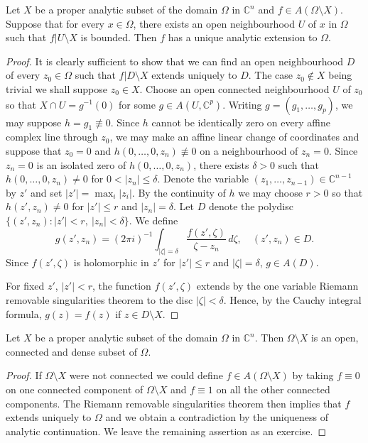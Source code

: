  Let $X$ be a proper analytic subset of the domain $\Omega$ in $\mathbb C^n$ and $f\in A(\Omega\setminus X)$. Suppose that for every $x\in\Omega$, there exists an open neighbourhood $U$ of $x$ in $\Omega$ such that $f|U\setminus X$ is bounded. Then $f$ has a unique analytic extension to $\Omega$.
\begin{proof}
It is clearly sufficient to show that we can find an open neighbourhood $D$ of every $z_0\in\Omega$ such that $f|D\setminus X$ extends uniquely to $D$. The case $z_0\notin X$ being trivial we shall suppose $z_0\in X$. Choose an open connected neighbourhood $U$ of $z_0$ so that $X\cap U=g^{-1}(0)$ for some $g\in A(U,\mathbb C^p)$. Writing $g=(g_1,\ldots,g_p)$, we may suppose $h=g_1\not\equiv0$. Since $h$ cannot be identically zero on every affine complex line through $z_0$, we may make an affine linear change of coordinates and suppose that $z_0=0$ and $h(0,\ldots,0,z_n)\not\equiv0$ on a neighbourhood of $z_n=0$. Since $z_n=0$ is an isolated zero of $h(0,\ldots,0,z_n)$, there exists $\delta>0$ such that $h(0,\ldots,0,z_n)\neq0$ for $0<|z_n|\leq\delta$. Denote the variable $(z_1,\ldots,z_{n-1})\in\mathbb C^{n-1}$ by $z'$ and set $|z'|=\max_i|z_i|$. By the continuity of $h$ we may choose $r>0$
so that $h(z',z_n)\neq0$ for $|z'|\leq r$ and $|z_n|=\delta$. Let $D$ denote the polydisc $\{(z',z_n):|z'|<r,\ |z_n|<\delta\}$. We define
\[g(z',z_n)=(2\pi i)^{-1}\int_{|\zeta|=\delta}\frac{f(z',\zeta)}{\zeta-z_n}\,d\zeta,\quad (z',z_n)\in D.\]
Since $f(z',\zeta)$ is holomorphic in $z'$ for $|z'|\leq r$ and $|\zeta|=\delta$, $g\in A(D)$.

For fixed $z'$, $|z'|<r$, the function $f(z',\zeta)$ extends by the one variable Riemann removable singularities theorem to the disc $|\zeta|<\delta$. Hence, by the Cauchy integral formula, $g(z)=f(z)$ if $z\in D\setminus X$.
\end{proof}
 Let $X$ be a proper analytic subset of the domain $\Omega$ in $\mathbb C^n$. Then $\Omega\setminus X$ is an open, connected and dense subset of $\Omega$.
\begin{proof}
If $\Omega\setminus X$ were not connected we could define $f\in A(\Omega\setminus X)$ by taking $f\equiv0$ on one connected component of $\Omega\setminus X$ and $f\equiv1$ on all the other connected components. The Riemann removable singularities theorem then implies that $f$ extends uniquely to $\Omega$ and we obtain a contradiction by the uniqueness of analytic continuation. We leave the remaining assertion as an exercise.
\end{proof}
